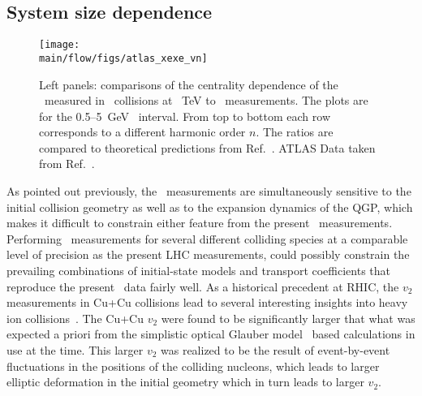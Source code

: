 \subsection{System size dependence}
\label{sec:flow_sizedep}

\begin{figure}[!ht]
\begin{center}
\texttt{[image: \\main/flow/figs/atlas\_xexe\_vn]}
\caption{
Left panels: comparisons of the centrality dependence of the \vn\ measured 
  in \pbpb\ collisions at ~TeV to \xexe\ measurements. 
The plots are for the 0.5--5~GeV \pT\ interval. 
From top to bottom each row corresponds to a different harmonic order $n$.
The ratios are compared to theoretical predictions from Ref.~\cite{Giacalone:2017dud}.
ATLAS Data taken from Ref.~\cite{ATLAS-CONF-2018-011}.
}
\label{fig:atlas_xexe_vn}
\end{center}
\end{figure}

As pointed out previously, the \vn\ measurements are simultaneously
  sensitive to the initial collision geometry as well as to the 
  expansion dynamics of the QGP, which makes it difficult to 
  constrain either feature from the present \vn\ measurements.
Performing \vn\ measurements for several different colliding species
  at a comparable level of precision as the present LHC measurements,  
  could possibly constrain the prevailing combinations of initial-state 
  models and transport coefficients that reproduce the present \vn\ data 
  fairly well.
As a historical precedent at RHIC, the $v_2$ measurements in Cu+Cu 
  collisions lead to several interesting insights into heavy ion 
  collisions~\cite{Adare:2006ti}.
The Cu+Cu $v_2$ were found to be significantly larger that what was 
  expected a priori from the simplistic optical Glauber model~\cite{Miller:2007ri}
  based calculations in use at the time.
This larger $v_2$ was realized to be the result of event-by-event fluctuations
  in the positions of the colliding nucleons, which leads to larger
  elliptic deformation in the initial geometry which in turn leads 
  to larger $v_2$.


